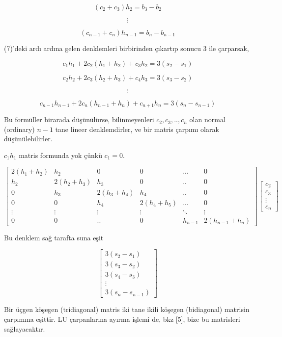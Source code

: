 \documentclass[12pt,fleqn]{article}\usepackage{../../common}
\begin{document}
$$  (c_2 + c_3) h_2  = b_3 - b_2$$

$$ \vdots $$

$$  (c_{n-1} + c_n) h_{n-1}  = b_n - b_{n-1}$$

(7)'deki ardı ardına gelen denklemleri birbirinden çıkartıp sonucu 3 ile
çarparsak, 

$$ c_1h_1 + 2c_2(h_1 + h_2) + c_3h_2 = 3(s_2 - s_1) $$

$$ c_2h_2 + 2c_3(h_2 + h_3) + c_4h_3 = 3(s_3 - s_2) $$

$$ \vdots $$

$$ c_{n-1}h_{n-1} + 2c_n(h_{n-1} + h_{n}) + c_{n+1}h_n = 3(s_n - s_{n-1}) $$

Bu formüller birarada düşünülürse, bilinmeyenleri $c_2,c_3,..,c_n$ olan
normal (ordinary) $n-1$ tane lineer denklemdirler, ve bir matris çarpımı
olarak düşünülebilirler. 

$c_1h_1$ matris formunda yok çünkü $c_1=0$. 

$$ 
\left[\begin{array}{cccccc}
2(h_1+h_2) & h_2 & 0 & 0 & ... & 0 \\
h_2 & 2(h_2+h_3) & h_3 & 0 & .. & 0  \\
0 & h_3 & 2(h_3+h_4) & h_4 & .. & 0 \\
0 & 0 & h_4 & 2(h_4+h_5) & ... & 0 \\
\vdots & \vdots & \vdots & \vdots & \ddots & \vdots  \\
0 & 0 & .. & 0 & h_{n-1} & 2(h_{n-1}+h_n) 
\end{array}\right]
\left[\begin{array}{r}
c_2 \\ c_3 \\ \vdots \\ c_n
\end{array}\right]
 $$

Bu denklem sağ tarafta suna eşit 

$$ 
\left[\begin{array}{r}
3(s_2 - s_1) \\
3(s_3 - s_2) \\
3(s_4 - s_3) \\
\vdots \\
3(s_n - s_{n-1}) 
\end{array}\right]
 $$

 Bir üçgen köşegen (tridiagonal) matris iki tane ikili köşegen (bidiagonal)
 matrisin çarpımına eşittir. LU çarpanlarına ayırma işlemi de, bkz [5], bize
 bu matrisleri sağlayacaktır.
\end{document}
